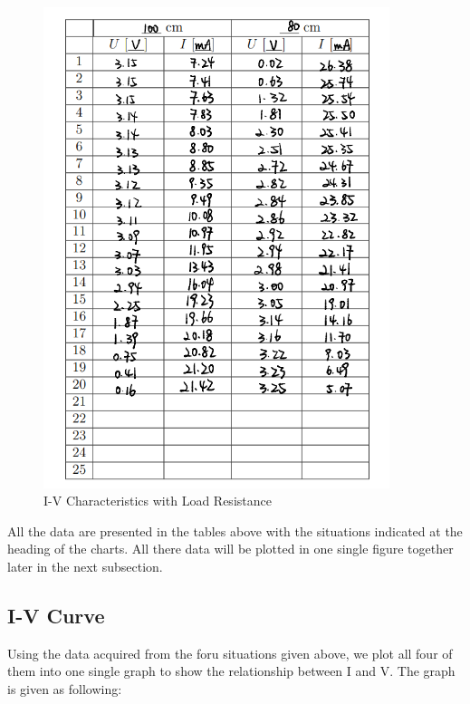 \documentclass[12pt, a4paper, oneside]{article}
\begin{document}
\begin{figure}[htbp]
	\centering
	\includegraphics[width=0.9\textwidth]{D5.png}
	\caption{I-V Characteristics with Load Resistance}
	\label{fig2}
\end{figure}

All the data are presented in the tables above with the situations indicated at the heading of the charts.
All there data will be plotted in one single figure together later in the next subsection.

\subsection{I-V Curve}
\indent

Using the data acquired from the foru situations given above, we plot all four of them into one single graph
to show the relationship between I and V. The graph is given as following:
\end{document}
